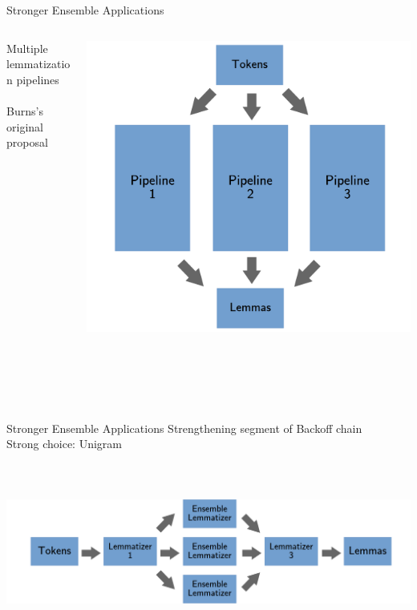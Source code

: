\documentclass[aspectratio=169,xcolor=dvipsnames]{beamer}
\begin{document}
\begin{frame}[t]{Stronger Ensemble Applications}

    \begin{columns}
        \begin{column}{0.5\textwidth}
            Multiple lemmatization pipelines \\ \ \\
            Burns's original proposal
        \end{column}
        \begin{column}{0.5\textwidth}
              \centering
            \includegraphics[width=1\textwidth]{ensemble_of_backoffs_model_v4.png} \\ \ \\ \ \\ \ \\ \ \\
        \end{column}
    \end{columns}
           
    
\end{frame}

\begin{frame}[t]{Stronger Ensemble Applications}
             Strengthening segment of Backoff chain\\
                        Strong choice: Unigram \\ \ \\ \ \\ \ \\
            \centering
            \includegraphics[width=1\textwidth]{backoff_of_ensembles_model_v3.png} \\ \ \\

\end{frame}
\end{document}
